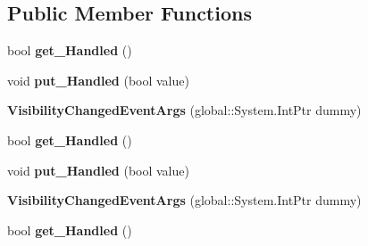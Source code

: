 \subsection*{Public Member Functions}
\begin{DoxyCompactItemize}
\item 
\mbox{\label{class_windows_1_1_u_i_1_1_core_1_1_visibility_changed_event_args_a3e8ad74a57739aa61826f401c9ea660f}} 
bool {\bfseries get\+\_\+\+Handled} ()
\item 
\mbox{\label{class_windows_1_1_u_i_1_1_core_1_1_visibility_changed_event_args_aa3d934d7b901facdfa204fc5af9a49c2}} 
void {\bfseries put\+\_\+\+Handled} (bool value)
\item 
\mbox{\label{class_windows_1_1_u_i_1_1_core_1_1_visibility_changed_event_args_ab02568d4fa2ba877a196ee99ea9e28ea}} 
{\bfseries Visibility\+Changed\+Event\+Args} (global\+::\+System.\+Int\+Ptr dummy)
\item 
\mbox{\label{class_windows_1_1_u_i_1_1_core_1_1_visibility_changed_event_args_a3e8ad74a57739aa61826f401c9ea660f}} 
bool {\bfseries get\+\_\+\+Handled} ()
\item 
\mbox{\label{class_windows_1_1_u_i_1_1_core_1_1_visibility_changed_event_args_aa3d934d7b901facdfa204fc5af9a49c2}} 
void {\bfseries put\+\_\+\+Handled} (bool value)
\item 
\mbox{\label{class_windows_1_1_u_i_1_1_core_1_1_visibility_changed_event_args_ab02568d4fa2ba877a196ee99ea9e28ea}} 
{\bfseries Visibility\+Changed\+Event\+Args} (global\+::\+System.\+Int\+Ptr dummy)
\item 
\mbox{\label{class_windows_1_1_u_i_1_1_core_1_1_visibility_changed_event_args_a3e8ad74a57739aa61826f401c9ea660f}} 
bool {\bfseries get\+\_\+\+Handled} ()
\item 

\end{DoxyCompactItemize}
